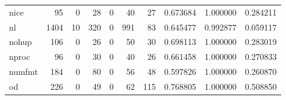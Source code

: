 \begin{longtable}{lrrrrrrrrr}
nice      &                                                 95 &                                                  0 &                                                 28 &                                                  0 &                                                 40 &                                                 27 &                                           0.673684 &                               1.000000 &                             0.284211 \\
nl        &                                               1404 &                                                 10 &                                                320 &                                                  0 &                                                991 &                                                 83 &                                           0.645477 &                               0.992877 &                             0.059117 \\
nohup     &                                                106 &                                                  0 &                                                 26 &                                                  0 &                                                 50 &                                                 30 &                                           0.698113 &                               1.000000 &                             0.283019 \\
nproc     &                                                 96 &                                                  0 &                                                 30 &                                                  0 &                                                 40 &                                                 26 &                                           0.661458 &                               1.000000 &                             0.270833 \\
numfmt    &                                                184 &                                                  0 &                                                 80 &                                                  0 &                                                 56 &                                                 48 &                                           0.597826 &                               1.000000 &                             0.260870 \\
od        &                                                226 &                                                  0 &                                                 49 &                                                  0 &                                                 62 &                                                115 &                                           0.768805 &                               1.000000 &                             0.508850 \\

\end{longtable}
